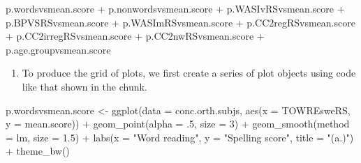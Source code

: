 \documentclass[
  letterpaper,
  DIV=11,
  numbers=noendperiod]{scrreprt}
\newenvironment{Shaded}{\begin{snugshade}}{\end{snugshade}}
\newcommand{\AttributeTok}[1]{\textcolor[rgb]{0.40,0.45,0.13}{#1}}
\newcommand{\DecValTok}[1]{\textcolor[rgb]{0.68,0.00,0.00}{#1}}
\newcommand{\FloatTok}[1]{\textcolor[rgb]{0.68,0.00,0.00}{#1}}
\newcommand{\FunctionTok}[1]{\textcolor[rgb]{0.28,0.35,0.67}{#1}}
\newcommand{\NormalTok}[1]{\textcolor[rgb]{0.00,0.23,0.31}{#1}}
\newcommand{\OtherTok}[1]{\textcolor[rgb]{0.00,0.23,0.31}{#1}}
\newcommand{\SpecialCharTok}[1]{\textcolor[rgb]{0.37,0.37,0.37}{#1}}
\newcommand{\StringTok}[1]{\textcolor[rgb]{0.13,0.47,0.30}{#1}}
\providecommand{\tightlist}{%
  \setlength{\itemsep}{0pt}\setlength{\parskip}{0pt}}\usepackage{longtable,booktabs,array}
\begin{document}
\begin{Shaded}
\begin{Highlighting}[]
\NormalTok{p.wordsvsmean.score }\SpecialCharTok{+}\NormalTok{ p.nonwordsvsmean.score }\SpecialCharTok{+}\NormalTok{ p.WASIvRSvsmean.score }\SpecialCharTok{+}
\NormalTok{  p.BPVSRSvsmean.score }\SpecialCharTok{+}\NormalTok{ p.WASImRSvsmean.score }\SpecialCharTok{+}\NormalTok{ p.CC2regRSvsmean.score }\SpecialCharTok{+}
\NormalTok{  p.CC2irregRSvsmean.score }\SpecialCharTok{+}\NormalTok{ p.CC2nwRSvsmean.score }\SpecialCharTok{+}\NormalTok{ p.age.groupvsmean.score}
\end{Highlighting}
\end{Shaded}

\begin{enumerate}
\def\labelenumi{\arabic{enumi}.}
\tightlist
\item
  To produce the grid of plots, we first create a series of plot objects
  using code like that shown in the chunk.
\end{enumerate}

\begin{Shaded}
\begin{Highlighting}[]
\NormalTok{p.wordsvsmean.score }\OtherTok{\textless{}{-}} \FunctionTok{ggplot}\NormalTok{(}\AttributeTok{data =}\NormalTok{ conc.orth.subjs, }
                              \FunctionTok{aes}\NormalTok{(}\AttributeTok{x =}\NormalTok{ TOWREsweRS, }
                              \AttributeTok{y =}\NormalTok{ mean.score)) }\SpecialCharTok{+}
  \FunctionTok{geom\_point}\NormalTok{(}\AttributeTok{alpha =}\NormalTok{ .}\DecValTok{5}\NormalTok{, }\AttributeTok{size =} \DecValTok{3}\NormalTok{) }\SpecialCharTok{+}
  \FunctionTok{geom\_smooth}\NormalTok{(}\AttributeTok{method =} \StringTok{\textquotesingle{}lm\textquotesingle{}}\NormalTok{, }\AttributeTok{size =} \FloatTok{1.5}\NormalTok{) }\SpecialCharTok{+}
  \FunctionTok{labs}\NormalTok{(}\AttributeTok{x =} \StringTok{"Word reading"}\NormalTok{, }
       \AttributeTok{y =} \StringTok{"Spelling score"}\NormalTok{,}
       \AttributeTok{title =} \StringTok{"(a.)"}\NormalTok{) }\SpecialCharTok{+}
  \FunctionTok{theme\_bw}\NormalTok{()}
\end{Highlighting}
\end{Shaded}
\end{document}
